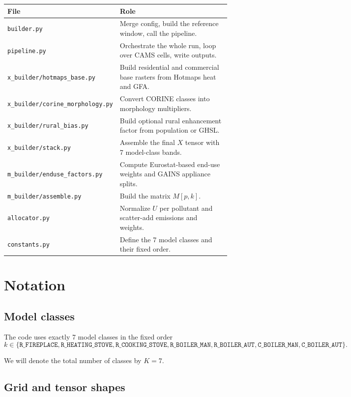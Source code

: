 \documentclass[11pt,a4paper]{article}
\begin{document}
\begin{center}
\begin{tabular}{p{0.28\linewidth}p{0.62\linewidth}}
\toprule
\textbf{File} & \textbf{Role} \\
\midrule
\texttt{builder.py} & Merge config, build the reference window, call the pipeline. \\
\texttt{pipeline.py} & Orchestrate the whole run, loop over CAMS cells, write outputs. \\
\texttt{x\_builder/hotmaps\_base.py} & Build residential and commercial base rasters from Hotmaps heat and GFA. \\
\texttt{x\_builder/corine\_morphology.py} & Convert CORINE classes into morphology multipliers. \\
\texttt{x\_builder/rural\_bias.py} & Build optional rural enhancement factor from population or GHSL. \\
\texttt{x\_builder/stack.py} & Assemble the final $X$ tensor with 7 model-class bands. \\
\texttt{m\_builder/enduse\_factors.py} & Compute Eurostat-based end-use weights and GAINS appliance splits. \\
\texttt{m\_builder/assemble.py} & Build the matrix $M[p,k]$. \\
\texttt{allocator.py} & Normalize $U$ per pollutant and scatter-add emissions and weights. \\
\texttt{constants.py} & Define the 7 model classes and their fixed order. \\
\bottomrule
\end{tabular}
\end{center}

\section{Notation}

\subsection{Model classes}

The code uses exactly 7 model classes in the fixed order
\[
k \in \{
\texttt{R\_FIREPLACE},
\texttt{R\_HEATING\_STOVE},
\texttt{R\_COOKING\_STOVE},
\texttt{R\_BOILER\_MAN},
\texttt{R\_BOILER\_AUT},
\texttt{C\_BOILER\_MAN},
\texttt{C\_BOILER\_AUT}
\}.
\]

We will denote the total number of classes by $K=7$.

\subsection{Grid and tensor shapes}
\end{document}
